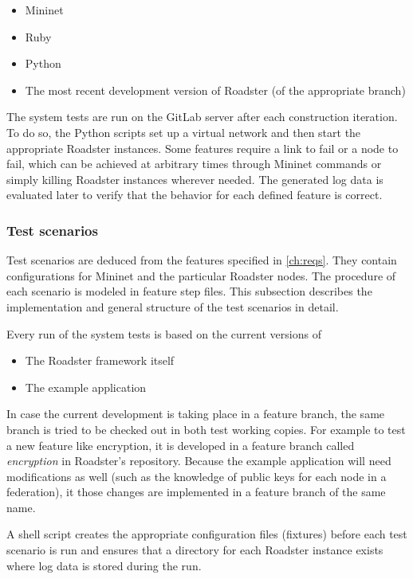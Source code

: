\begin{itemize}
	\item Mininet
	\item Ruby
	\item Python
	\item The most recent development version of Roadster (of the appropriate branch)
\end{itemize}

The system tests are run on the GitLab server after each construction
iteration. To do so, the Python scripts set up a virtual network and then start
the appropriate Roadster instances. Some features require a link to fail or a
node to fail, which can be achieved at arbitrary times through Mininet commands or
simply killing Roadster instances wherever needed. The generated log data is
evaluated later to verify that the behavior for each defined feature is
correct.


\subsubsection{Test scenarios}
Test scenarios are deduced from the features specified in \autoref{ch:reqs}.
They contain configurations for Mininet and the particular Roadster nodes.
The procedure of each scenario is modeled in feature step files. This subsection
describes the implementation and general structure of the test scenarios in detail.


Every run of the system tests is based on the current versions of

\begin{itemize}
	\item The Roadster framework itself
	\item The example application
\end{itemize}

In case the current development is taking place in a feature branch, the same
branch is tried to be checked out in both test working copies. For example to
test a new feature like encryption, it is developed in a feature branch called
\emph{encryption} in Roadster's repository. Because the example application
will need modifications as well (such as the knowledge of public keys for each
node in a federation), it those changes are implemented in a feature branch of
the same name.

A shell script creates the appropriate configuration files (fixtures) before
each test scenario is run and ensures that a directory for each Roadster
instance exists where log data is stored during the run.

